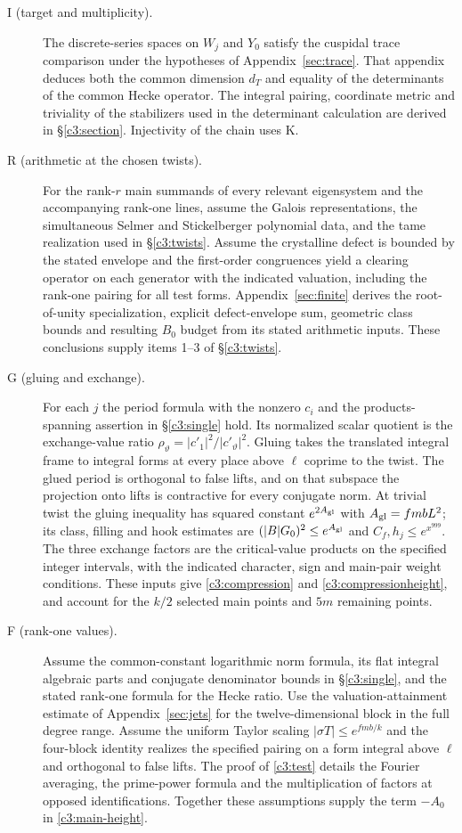 \begin{description}
\item[I (target and multiplicity).]
The discrete-series spaces on $W_j$ and $Y_0$ satisfy the
cuspidal trace comparison under the hypotheses of
Appendix~\ref{sec:trace}. That appendix deduces both the common
dimension $d_T$ and equality of the determinants of the common
Hecke operator. The integral pairing, coordinate metric and
triviality of the stabilizers used in the determinant calculation
are derived in \S\ref{c3:section}. Injectivity of the chain uses K.

\item[R (arithmetic at the chosen twists).]
For the rank-$r$ main summands of every relevant eigensystem and
the accompanying rank-one lines, assume the Galois representations,
the simultaneous Selmer and Stickelberger polynomial data, and
the tame realization used in \S\ref{c3:twists}. Assume the
crystalline defect is bounded by the stated envelope and the
first-order congruences yield a clearing operator on each generator
with the indicated valuation, including the rank-one pairing
for all test forms. Appendix~\ref{sec:finite} derives the
root-of-unity specialization, explicit defect-envelope sum, geometric
class bounds and resulting $B_0$ budget from its stated arithmetic
inputs. These conclusions supply items 1--3 of \S\ref{c3:twists}.

\item[G (gluing and exchange).]
For each $j$ the period formula with the nonzero $c_i$ and the
products-spanning assertion in \S\ref{c3:single} hold. Its normalized
scalar quotient is the exchange-value ratio
$\rho_\vartheta=|c'_1|^2/|c'_\vartheta|^2$.
Gluing takes the translated integral frame to integral forms at
every place above $\ell$ coprime to the twist. The glued period
is orthogonal to false lifts, and on that subspace the projection
onto lifts is contractive for every conjugate norm. At trivial
twist the gluing inequality has squared constant $e^{2A_{\rm gl}}$ with
$A_{\rm gl}=fmbL^2$; its class, filling and hook estimates are
$(|B|G_0)^2\le e^{A_{\rm gl}}$ and $C_f,h_j\le e^{x^{999}}$.
The three exchange factors are the critical-value products on the
specified integer intervals, with the indicated character, sign and
main-pair weight conditions. These inputs give
\eqref{c3:compression} and \eqref{c3:compressionheight}, and account
for the $k/2$ selected main points and $5m$ remaining points.

\item[F (rank-one values).]
Assume the common-constant logarithmic norm formula, its flat
integral algebraic parts and conjugate denominator bounds in
\S\ref{c3:single}, and the stated rank-one formula for the
Hecke ratio. Use the valuation-attainment estimate of
Appendix~\ref{sec:jets} for the twelve-dimensional block in
the full degree range. Assume the uniform Taylor scaling
$|\sigma T|\le e^{fmb/k}$ and the four-block identity realizes
the specified pairing on a form integral above $\ell$ and
orthogonal to false lifts. The proof of \eqref{c3:test} details the
Fourier averaging, the prime-power formula and the multiplication
of factors at opposed identifications. Together these assumptions
supply the term $-A_0$ in \eqref{c3:main-height}.


\end{description}
